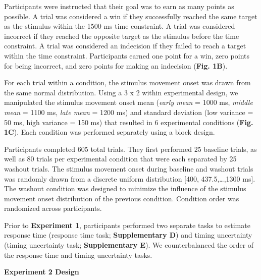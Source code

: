 \documentclass[12pt]{article}
\newcommand\boldblue[1]{\textcolor{mydarkblue}{\textbf{#1}}}
\begin{document}
Participants were instructed that their goal was to earn as many points as possible. A trial was considered a win if they successfully reached the same target as the stimulus within the 1500 ms time constraint. A trial was considered incorrect if they reached the opposite target as the stimulus before the time constraint. A trial was considered an indecision if they failed to reach a target within the time constraint. Participants earned one point for a win, zero points for being incorrect, and zero points for making an indecision (\boldblue{Fig. 1B}).

For each trial within a condition, the stimulus movement onset was drawn from the same normal distribution. Using a 3 x 2 within experimental design, we manipulated the stimulus movement onset mean (\emph{early mean} = 1000 ms, \emph{middle mean} = 1100 ms, \emph{late mean} = 1200 ms) and standard deviation (low variance = 50 ms, high variance = 150 ms) that resulted in 6 experimental conditions (\boldblue{Fig. 1C}).  Each condition was performed separately using a block design.

Participants completed 605 total trials. They first performed 25 baseline trials, as well as 80 trials per experimental condition that were each separated by 25 washout trials. The stimulus movement onset during baseline and washout trials was randomly drawn from a discrete uniform distribution [400, 437.5,…,1300 ms]. The washout condition was designed to minimize the influence of the stimulus movement onset distribution of the previous condition. Condition order was randomized across participants.

Prior to \boldblue{Experiment 1}, participants performed two separate tasks to estimate response time (response time task; \boldblue{Supplementary D}) and timing uncertainty (timing uncertainty task; \boldblue{Supplementary E}). We counterbalanced the order of the response time and timing uncertainty tasks.

\vspace{2mm}
\noindent\boldblue{\large Experiment 2 Design}
\end{document}
